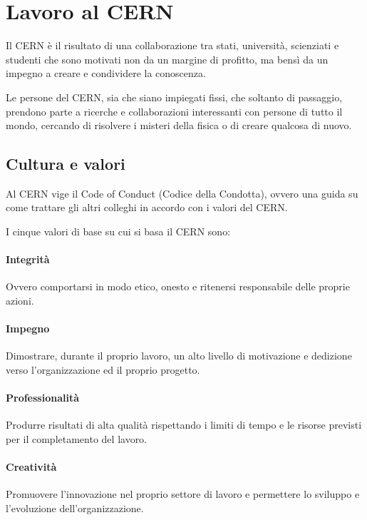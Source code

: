 	\section{Lavoro al CERN} \label{sec:C;lavoro}
	
		Il \ac{CERN} è il risultato di una collaborazione tra stati, università, scienziati e studenti che sono motivati non da un margine di profitto, ma bensì da un impegno a creare e condividere la conoscenza.
		
		Le persone del \ac{CERN}, sia che siano impiegati fissi, che soltanto di passaggio, prendono parte a ricerche e collaborazioni interessanti con persone di tutto il mondo, cercando di risolvere i misteri della fisica o di creare qualcosa di nuovo.
		
		\subsection{Cultura e valori} \label{subsec:C;l;cultura_e_valori}
		
			Al \ac{CERN} vige il Code of Conduct (Codice della Condotta), ovvero una guida su come trattare gli altri colleghi in accordo con i valori del \ac{CERN}. \cite{cern:culture_values}
			
			I cinque valori di base su cui si basa il \ac{CERN} sono:
			
			\paragraph{Integrit\`{a}}Ovvero comportarsi in modo etico, onesto e ritenersi responsabile delle proprie azioni.
			
			\paragraph{Impegno}Dimostrare, durante il proprio lavoro, un alto livello di motivazione e dedizione verso l'organizzazione ed il proprio progetto.
			
			\paragraph{Professionalit\`{a}}Produrre risultati di alta qualità rispettando i limiti di tempo e le risorse previsti per il completamento del lavoro.
			
			\paragraph{Creativit\`{a}}Promuovere l'innovazione nel proprio settore di lavoro e permettere lo sviluppo e l'evoluzione dell'organizzazione.
			
